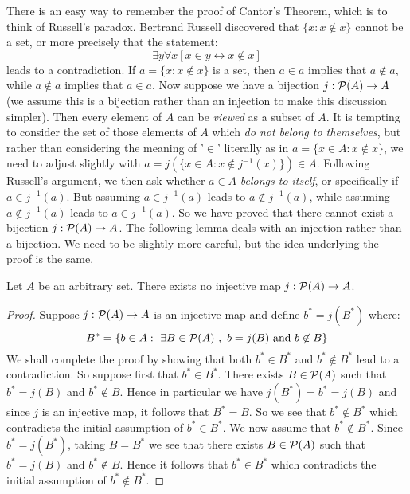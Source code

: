 There is an easy way to remember the proof of Cantor's Theorem, which is to think
of Russell's paradox. Bertrand Russell discovered that $\{x: x\not\in x\}$ cannot
be a set, or more precisely that the statement:
    \[
    \exists y\forall x [x\in y \leftrightarrow x\not\in x]
    \]
 leads to a contradiction. If $a=\{x:x\not\in x\}$ is a set, then $a\in a$ implies
 that $a\not\in a$, while $a\not\in a$ implies that $a\in a$. Now suppose we have
 a bijection $j:{\cal P}(A)\to A$ (we assume this is a bijection rather than an
 injection to make this discussion simpler). Then every element of $A$ can be {\em
 viewed} as a subset of $A$. It is tempting to consider the set of those elements
 of $A$ which {\em do not belong to themselves}, but rather than considering the
 meaning of '$\in$' literally as in $a=\{x\in A: x\not\in x\}$, we need to adjust
 slightly with $a=j(\{x\in A: x\not\in j^{-1}(x)\})\in A$. Following Russell's
 argument, we then ask whether $a\in A$ {\em belongs to itself}, or specifically
 if $a\in j^{-1}(a)$. But assuming $a\in j^{-1}(a)$ leads to $a\not\in j^{-1}(a)$,
 while assuming $a\not\in j^{-1}(a)$ leads to $a\in j^{-1}(a)$. So we have proved
 that there cannot exist a bijection $j:{\cal P}(A)\to A$. The following lemma
 deals with an injection rather than a bijection. We need to be slightly more
 careful, but the idea underlying the proof is the same.
\begin{lemma}\label{logic:cantor:theorem} Let $A$ be an
arbitrary set. There exists no injective map $j:{\cal P}(A)\to A$. \end{lemma}
\begin{proof} Suppose $j:{\cal P}(A)\to A$ is an injective map and define
$b^{*}=j(B^{*})$ where:
    \[
    B^{*} =\{b\in A:\ \exists B\in{\cal P}(A)\ ,\ b=j(B)\mbox{\ and\ }b\not\in
    B\}
    \]
We shall complete the proof by showing that both $b^{*}\in B^{*}$ and
$b^{*}\not\in B^{*}$ lead to a contradiction. So suppose first that $b^{*}\in
B^{*}$. There exists $B\in{\cal P}(A)$ such that $b^{*}=j(B)$ and $b^{*}\not\in
B$. Hence in particular we have $j(B^{*})=b^{*}=j(B)$ and since $j$ is an
injective map, it follows that $B^{*}=B$. So we see that $b^{*}\not\in B^{*}$
which contradicts the initial assumption of $b^{*}\in B^{*}$. We now assume that
$b^{*}\not\in B^{*}$. Since $b^{*}=j(B^{*})$, taking $B=B^{*}$ we see that there
exists $B\in{\cal P}(A)$ such that $b^{*}=j(B)$ and $b^{*}\not\in B$. Hence it
follows that $b^{*}\in B^{*}$ which contradicts the initial assumption of
$b^{*}\not\in B^{*}$. \end{proof}
